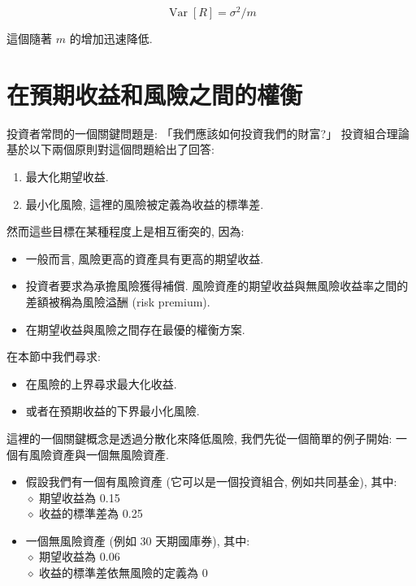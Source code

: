 \documentclass[letterpaper]{article}
\begin{document}
		$$
		\operatorname{Var}[R]=\sigma^{2} / m
		$$
		
		這個隨著 $m$ 的增加迅速降低.
		
		\section{在預期收益和風險之間的權衡}
		投資者常問的一個關鍵問題是: 「我們應該如何投資我們的財富?」  投資組合理論基於以下兩個原則對這個問題給出了回答: 
		
		\begin{enumerate}
			\item 最大化期望收益.
			\item 最小化風險, 這裡的風險被定義為收益的標準差. 
		\end{enumerate}
		
		然而這些目標在某種程度上是相互衝突的, 因為: 
		
		\begin{itemize}
			\item 一般而言, 風險更高的資產具有更高的期望收益.
			\item 投資者要求為承擔風險獲得補償. 風險資產的期望收益與無風險收益率之間的差額被稱為風險溢酬 (risk premium). 
			\item 在期望收益與風險之間存在最優的權衡方案.
		\end{itemize}
		
		在本節中我們尋求: 
		
		\begin{itemize}
			\item 在風險的上界尋求最大化收益. 
			\item 或者在預期收益的下界最小化風險. 
		\end{itemize}
		
		
		這裡的一個關鍵概念是透過分散化來降低風險, 我們先從一個簡單的例子開始: 一個有風險資產與一個無風險資產. 
		
		\begin{itemize}
			\item 假設我們有一個有風險資產 (它可以是一個投資組合, 例如共同基金), 其中: \\
			$\diamond$ 期望收益為 0.15\\
			$\diamond$ 收益的標準差為 0.25
			\item 一個無風險資產 (例如 30 天期國庫券), 其中: \\
			$\diamond$ 期望收益為 0.06\\
			$\diamond$ 收益的標準差依無風險的定義為 0
		\end{itemize}
		
\end{document}
